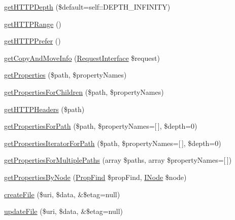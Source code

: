 \begin{DoxyCompactItemize}
\mbox{\hyperlink{class_sabre_1_1_d_a_v_1_1_server_a2f7c4e9989ed12ddf2e93b7cb25ff4de}{get\+H\+T\+T\+P\+Depth}} (\$default=self\+::\+D\+E\+P\+T\+H\+\_\+\+I\+N\+F\+I\+N\+I\+TY)
\item 
\mbox{\hyperlink{class_sabre_1_1_d_a_v_1_1_server_ae8c4a77fdab337aaa99d039d8e88226d}{get\+H\+T\+T\+P\+Range}} ()
\item 
\mbox{\hyperlink{class_sabre_1_1_d_a_v_1_1_server_a59300709495a2ec31ddfa88084dd05ef}{get\+H\+T\+T\+P\+Prefer}} ()
\item 
\mbox{\hyperlink{class_sabre_1_1_d_a_v_1_1_server_afb6c0f88c5eacd47185731b933a3d5bb}{get\+Copy\+And\+Move\+Info}} (\mbox{\hyperlink{interface_sabre_1_1_h_t_t_p_1_1_request_interface}{Request\+Interface}} \$request)
\item 
\mbox{\hyperlink{class_sabre_1_1_d_a_v_1_1_server_afee03b6eff812fb064b525db24bbd427}{get\+Properties}} (\$path, \$property\+Names)
\item 
\mbox{\hyperlink{class_sabre_1_1_d_a_v_1_1_server_a55ed74587fe23c70e2d95fae3838932f}{get\+Properties\+For\+Children}} (\$path, \$property\+Names)
\item 
\mbox{\hyperlink{class_sabre_1_1_d_a_v_1_1_server_a9f4cb8d2befd078d02eb1d6b12d92384}{get\+H\+T\+T\+P\+Headers}} (\$path)
\item 
\mbox{\hyperlink{class_sabre_1_1_d_a_v_1_1_server_ab304acd53ee19f7ddbcaaef3598d3558}{get\+Properties\+For\+Path}} (\$path, \$property\+Names=\mbox{[}$\,$\mbox{]}, \$depth=0)
\item 
\mbox{\hyperlink{class_sabre_1_1_d_a_v_1_1_server_ab67fbe0b4085a2cffe442bf76672c6f7}{get\+Properties\+Iterator\+For\+Path}} (\$path, \$property\+Names=\mbox{[}$\,$\mbox{]}, \$depth=0)
\item 
\mbox{\hyperlink{class_sabre_1_1_d_a_v_1_1_server_a729bc3a683ac54b3f94192e45047bdd3}{get\+Properties\+For\+Multiple\+Paths}} (array \$paths, array \$property\+Names=\mbox{[}$\,$\mbox{]})
\item 
\mbox{\hyperlink{class_sabre_1_1_d_a_v_1_1_server_a0cb2caf06a39a43039dd5286c84b7925}{get\+Properties\+By\+Node}} (\mbox{\hyperlink{class_sabre_1_1_d_a_v_1_1_prop_find}{Prop\+Find}} \$prop\+Find, \mbox{\hyperlink{interface_sabre_1_1_d_a_v_1_1_i_node}{I\+Node}} \$node)
\item 
\mbox{\hyperlink{class_sabre_1_1_d_a_v_1_1_server_a7bee663affd9e5dfe5f50ca8559ee9a8}{create\+File}} (\$uri, \$data, \&\$etag=null)
\item 
\mbox{\hyperlink{class_sabre_1_1_d_a_v_1_1_server_a33f262bd916b6e98e14d7fbe98edcede}{update\+File}} (\$uri, \$data, \&\$etag=null)

\end{DoxyCompactItemize}
